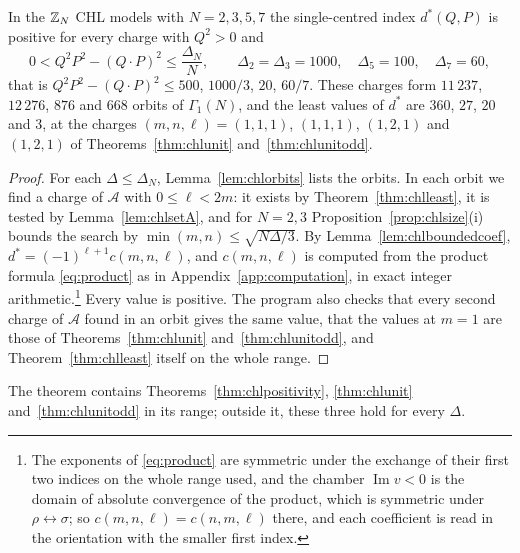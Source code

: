 \begin{theorem}\label{thm:chlbounded}
In the $\mathbb{Z}_N$ CHL models with $N=2,3,5,7$ the single-centred index $d^*(Q,P)$ is positive for every charge with $Q^2>0$ and
\[
0<Q^2P^2-(Q\cdot P)^2\le\frac{\Delta_N}N,\qquad \Delta_2=\Delta_3=1000,\quad\Delta_5=100,\quad \Delta_7=60,
\]
that is $Q^2P^2-(Q\cdot P)^2\le500$, $1000/3$, $20$, $60/7$. These charges form $11\,237$, $12\,276$, $876$ and $668$ orbits of $\Gamma_1(N)$, and the least values of $d^*$ are $360$, $27$, $20$ and $3$, at the charges $(m,n,\ell)=(1,1,1)$, $(1,1,1)$, $(1,2,1)$ and $(1,2,1)$ of Theorems~\ref{thm:chlunit} and~\ref{thm:chlunitodd}.
\end{theorem}

\begin{proof}
For each $\Delta\le\Delta_N$, Lemma~\ref{lem:chlorbits} lists the orbits. In each orbit we find a charge of $\mathcal A$ with $0\le\ell<2m$: it exists by Theorem~\ref{thm:chlleast}, it is tested by Lemma~\ref{lem:chlsetA}, and for $N=2,3$ Proposition~\ref{prop:chlsize}(i) bounds the search by $\min(m,n)\le\sqrt{N\Delta/3}$. By Lemma~\ref{lem:chlboundedcoef}, $d^*=(-1)^{\ell+1}c(m,n,\ell)$, and $c(m,n,\ell)$ is computed from the product formula \eqref{eq:product} as in Appendix~\ref{app:computation}, in exact integer arithmetic.\footnote{The exponents of \eqref{eq:product} are symmetric under the exchange of their first two indices on the whole range used, and the chamber $\operatorname{Im}v<0$ is the domain of absolute convergence of the product, which is symmetric under $\rho\leftrightarrow\sigma$; so $c(m,n,\ell)=c(n,m,\ell)$ there, and each coefficient is read in the orientation with the smaller first index.} Every value is positive. The program \cite{Bha26} also checks that every second charge of $\mathcal A$ found in an orbit gives the same value, that the values at $m=1$ are those of Theorems~\ref{thm:chlunit} and~\ref{thm:chlunitodd}, and Theorem~\ref{thm:chlleast} itself on the whole range.
\end{proof}

The theorem contains Theorems~\ref{thm:chlpositivity}, \ref{thm:chlunit} and~\ref{thm:chlunitodd} in its range; outside it, these three hold for every $\Delta$.

